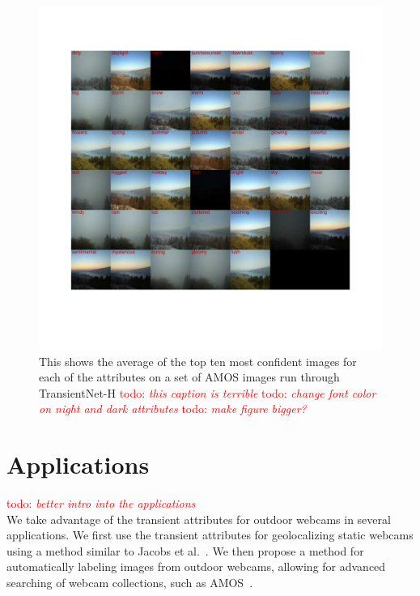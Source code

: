 \documentclass[10pt,twocolumn,letterpaper]{article}
\newcommand{\todo}[1]{\textcolor{red}{todo: {\em #1}}}
\begin{document}
\begin{figure}[t!]
	\centering
		\includegraphics[width=\textwidth, trim= 0 40mm 0 31mm]{figs/montage_cam_00007371.pdf}
		\caption{This shows the average of the top ten most confident images for
             each of the attributes on a set of AMOS images run through 
             TransientNet-H \todo{this caption is terrible} 
             \todo{change font color on night and dark attributes}
             \todo{make figure bigger?}} 
		\label{fig:netvis}
\end{figure}

\section{Applications}
\todo{better intro into the applications} \\
\indent
We take advantage of the transient attributes for outdoor webcams in several applications.
We first use the transient attributes for geolocalizing static webcams using a method
similar to Jacobs et al.~\cite{jacobs07geolocate}.  We then propose a method for
automatically labeling images from outdoor webcams, allowing for advanced searching
of webcam collections, such as AMOS~\cite{jacobs07amos}.
\end{document}
